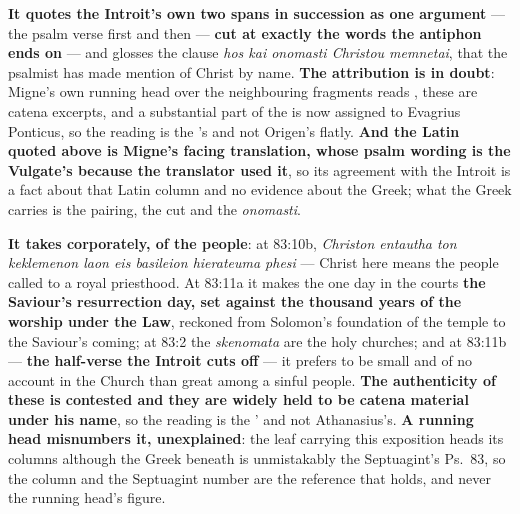 \begin{witnessnote}
 \textbf{It quotes the Introit's own two spans in succession as
one argument} --- the psalm verse first and then  --- \textbf{cut at exactly the words the antiphon ends
on} --- and glosses the clause \emph{hos kai onomasti Christou memnetai}, that
the psalmist has made mention of Christ by name. \textbf{The attribution is in
doubt}: Migne's own running head over the neighbouring fragments
reads , these are catena excerpts, and a substantial part of
the  is now assigned to Evagrius Ponticus, so the reading is the
's and not Origen's flatly. \textbf{And the Latin quoted above is Migne's
facing translation, whose psalm wording is the Vulgate's because the translator
used it}, so its agreement with the Introit is a fact about that Latin column
and no evidence about the Greek; what the Greek carries is the pairing, the cut
and the \emph{onomasti}.
\end{witnessnote}

\begin{witnessnote}
 \textbf{It takes  corporately, of the
people}: at 83:10b, \emph{Christon entautha ton keklemenon laon eis basileion
hierateuma phesi} --- Christ here means the people called to a royal priesthood.
At 83:11a it makes the one day in the courts \textbf{the Saviour's resurrection
day, set against the thousand years of the worship under the Law}, reckoned from
Solomon's foundation of the temple to the Saviour's coming; at 83:2 the
\emph{skenomata} are the holy churches; and at 83:11b --- \textbf{the half-verse
the Introit cuts off} --- it prefers to be small and of no account in the Church
than great among a sinful people. \textbf{The authenticity of these
 is contested and they are widely held to be catena material
under his name}, so the reading is the ' and not
Athanasius's. \textbf{A
running head misnumbers it, unexplained}: the leaf carrying this
exposition heads its columns  although the
Greek beneath is unmistakably the Septuagint's Ps.~83, so the column and the
Septuagint number are the reference that holds, and never the running head's
figure.
\end{witnessnote}


